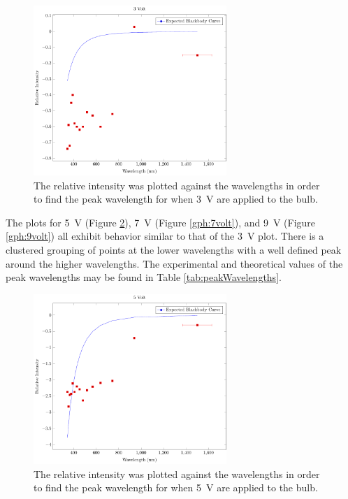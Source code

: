\documentclass[a4paper]{article}
\begin{document}
\begin{figure}[H]
  \begin{center}
    \includegraphics[width=0.65\textwidth]{P6-BlackbodyRadiation/Plots/3Volt/3volt.pdf}
  \end{center}
  \label{gph:3volt}
  \caption{The relative intensity was plotted against the wavelengths in order
    to find the peak wavelength for when \SI{3}{\volt} are applied to the bulb.}
\end{figure}

\qq The plots for \SI{5}{\volt} (Figure \ref{gph:5volt}), \SI{7}{\volt} (Figure
\ref{gph:7volt}), and \SI{9}{\volt} (Figure \ref{gph:9volt}) all exhibit
behavior similar to that of the \SI{3}{\volt} plot. There is a clustered
grouping of points at the lower wavelengths with a well defined peak around the
higher wavelengths. The experimental and theoretical values of the peak
wavelengths may be found in Table \ref{tab:peakWavelengths}. 

\begin{figure}[H]
  \begin{center}
    \includegraphics[width=0.65\textwidth]{P6-BlackbodyRadiation/Plots/5Volt/5volt.pdf}
  \end{center}
  \label{gph:5volt}
  \caption{The relative intensity was plotted against the wavelengths in order
    to find the peak wavelength for when \SI{5}{\volt} are applied to the bulb.}
\end{figure}
\end{document}

